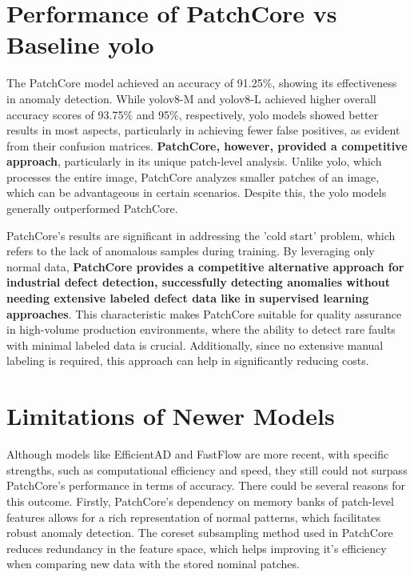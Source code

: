 \section*{Performance of PatchCore vs Baseline \gls{yolo}}

The PatchCore model achieved an accuracy of 91.25\%, showing its effectiveness in anomaly detection. While \gls{yolo}v8-M and \gls{yolo}v8-L achieved higher overall accuracy scores of 93.75\% and 95\%, respectively, \gls{yolo} models showed better results in most aspects, particularly in achieving fewer false positives, as evident from their confusion matrices. \textbf{PatchCore, however, provided a competitive approach}, particularly in its unique patch-level analysis. Unlike \gls{yolo}, which processes the entire image, PatchCore analyzes smaller patches of an image, which can be advantageous in certain scenarios. Despite this, the \gls{yolo} models generally outperformed PatchCore.

PatchCore's results are significant in addressing the 'cold start' problem, which refers to the lack of anomalous samples during training. By leveraging only normal data, \textbf{PatchCore provides a competitive alternative approach for industrial defect detection, successfully detecting anomalies without needing extensive labeled defect data like in supervised learning approaches}. This characteristic makes PatchCore suitable for quality assurance in high-volume production environments, where the ability to detect rare faults with minimal labeled data is crucial. Additionally, since no extensive manual labeling is required, this approach can help in significantly reducing costs.

\section*{Limitations of Newer Models}

Although models like EfficientAD and FastFlow are more recent, with specific strengths, such as computational efficiency and speed, they still could not surpass PatchCore's performance in terms of accuracy. There could be several reasons for this outcome. Firstly, PatchCore's dependency on memory banks of patch-level features allows for a rich representation of normal patterns, which facilitates robust anomaly detection. The coreset subsampling method used in PatchCore reduces redundancy in the feature space, which helps improving it's efficiency when comparing new data with the stored nominal patches.

